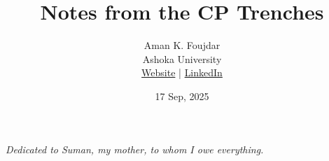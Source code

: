 \documentclass[11pt,openany]{book}
\title{Notes from the CP Trenches}
\author{
  Aman K. Foujdar \\
  Ashoka University \\
  \href{https://alwaysafoujdar.github.io/}{Website} | \href{https://www.linkedin.com/in/amanfoujdar/}{LinkedIn}
}
\date{17 Sep, 2025}
\begin{document}
\maketitle
\thispagestyle{empty}
\clearpage

\begin{center}
  \vspace*{4cm}
  \textit{Dedicated to Suman, my mother, to whom I owe everything.}
\end{center}
\clearpage


\frontmatter





\appendix


% 
% 

\end{document}
